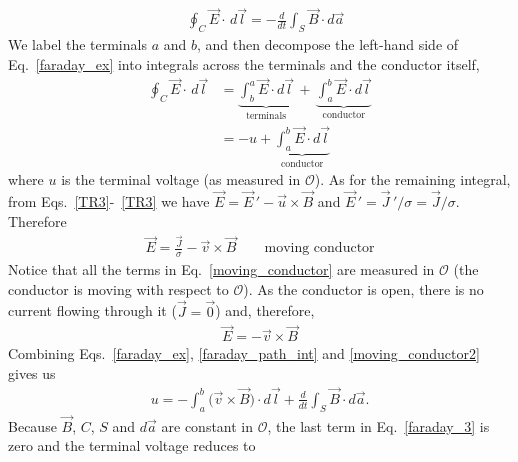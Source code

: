 \documentclass[12pt,a4paper,oneside]{book}
\begin{document}
\begin{onehalfspace}
 \begin{equation}\label{faraday_ex}
 	\begin{aligned}
 		&\oint_C \vec{E}\cdot\,d\vec{l}=-\frac{d}{d t}\int_S\vec{B}\cdot d\vec{a}
 	\end{aligned}
 \end{equation} 
We label the terminals $a$ and $b$, and then decompose the left-hand side of Eq.~\eqref{faraday_ex} into integrals across the terminals and the conductor itself,
 \begin{equation}\label{faraday_path_int}
	\begin{aligned}
		\oint_C \vec{E}\cdot\,d\vec{l}&=\underbrace{\int_{b}^{a}\vec{E}\cdot d\vec{l}}_{\text{terminals}}\,+\,\underbrace{\int_{a}^{b}\vec{E}\cdot d\vec{l}}_{\text{conductor}} \\[8pt]
		&=-u+\underbrace{\int_{a}^{b}\vec{E}\cdot d\vec{l}}_{\text{conductor}}
	\end{aligned}
\end{equation}  
where $u$ is the terminal voltage (as measured in $\mathcal{O}$). As for the remaining integral, from Eqs.~\eqref{TR3}-~\ref{TR3} we have $\vec{E} = \vec{E}\,'-\vec{u}\times\vec{B}$ and $\vec{E}\,' = \vec{J}\,'/\sigma = \vec{J}/\sigma$. Therefore
 \begin{equation}\label{moving_conductor}
	\begin{aligned}
		\vec{E}=\frac{\vec{J}}{\sigma}-\vec{v}\times\vec{B}\qquad\text{moving conductor}
	\end{aligned}
\end{equation} 
Notice that all the terms in Eq.~\eqref{moving_conductor} are measured in $\mathcal{O}$ (the conductor is moving with respect to $\mathcal{O}$). As the conductor is open, there is no current flowing through it ($\vec{J}=\vec{0}$) and, therefore,
 \begin{equation}\label{moving_conductor2}
	\begin{aligned}
		\vec{E}=-\vec{v}\times\vec{B}
	\end{aligned}
\end{equation} 
Combining Eqs.~\eqref{faraday_ex}, \ref{faraday_path_int} and \ref{moving_conductor2} gives us
 \begin{equation}\label{faraday_3}
	\begin{aligned}
		u=-\int_{a}^{b}\big(\vec{v}\times\vec{B}\big)\cdot d\vec{l} + \frac{d}{d t}\int_S\vec{B}\cdot d\vec{a}.
	\end{aligned}
\end{equation} 
Because $\vec{B}$, $C$, $S$ and $d\vec{a}$ are constant in $\mathcal{O}$, the last term in Eq.~\eqref{faraday_3} is zero and the terminal voltage reduces to 

\end{onehalfspace}
\end{document}
